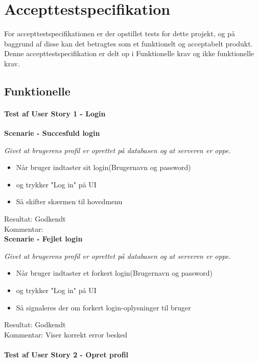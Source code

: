 \section{Accepttestspecifikation}
For accepttestspecifikationen er der opstillet tests for dette projekt, og på baggrund af disse kan det betragtes som et funktionelt og acceptabelt produkt. Denne accepttestspecifikation er delt op i Funktionelle krav og ikke funktionelle krav.

\subsection{Funktionelle}
\paragraph{Test af User Story 1 - Login}

\bf{Scenarie - Succesfuld login}

\it{Givet at brugerens profil er oprettet på databasen og at serveren er oppe.}

\begin{itemize}
  \item Når bruger indtaster sit login(Brugernavn og password)
  \item og trykker "Log in" på UI
  \item Så skifter skærmen til hovedmenu
\end{itemize}

Resultat: Godkendt\\
Kommentar:\\

\bf{Scenarie - Fejlet login}

\it{Givet at brugerens profil er oprettet på databasen og at serveren er oppe.}

\begin{itemize}
  \item Når bruger indtaster et forkert login(Brugernavn og password)
  \item og trykker "Log in" på UI
  \item Så signaleres der om forkert login-oplysninger til bruger
\end{itemize}

Resultat: Godkendt\\
Kommentar: Viser korrekt error besked\\

\paragraph{Test af User Story 2 - Opret profil}

